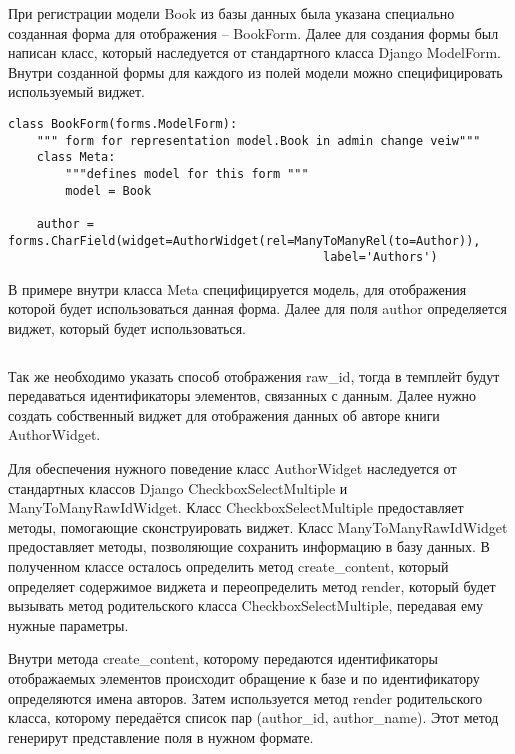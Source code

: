 \documentclass[a4paper, 12pt]{report}
\begin{document}
При регистрации модели Book из базы данных была указана специально созданная форма для отображения -- BookForm. Далее для создания формы был написан класс, который наследуется от стандартного класса Django ModelForm. Внутри созданной формы для каждого из полей модели можно специфицировать используемый виджет.

\begin{verbatim}
class BookForm(forms.ModelForm):
    """ form for representation model.Book in admin change veiw"""
    class Meta:
        """defines model for this form """
        model = Book

    author = forms.CharField(widget=AuthorWidget(rel=ManyToManyRel(to=Author)), 
                                            label='Authors')
\end{verbatim}

В примере внутри класса Meta специфицируется модель, для отображения которой будет использоваться данная форма. Далее для поля author определяется виджет, который будет использоваться. 

\begin{verbatim}

\end{verbatim}
Так же необходимо указать способ отображения raw\_id, тогда в темплейт будут передаваться идентификаторы элементов, связанных с данным. Далее нужно создать собственный виджет для отображения данных об авторе книги AuthorWidget. 

Для обеспечения нужного поведение класс AuthorWidget наследуется от стандартных классов Django CheckboxSelectMultiple и ManyToManyRawIdWidget. Класс CheckboxSelectMultiple предоставляет методы, помогающие сконструировать виджет. Класс ManyToManyRawIdWidget предоставляет методы, позволяющие сохранить информацию в базу данных. В полученном классе осталось определить метод create\_content, который определяет содержимое виджета и переопределить метод render, который будет вызывать метод родительского класса CheckboxSelectMultiple, передавая ему нужные параметры. 

Внутри метода create\_content, которому передаются идентификаторы отображаемых элементов происходит обращение к базе и по идентификатору определяются имена авторов. Затем используется метод render родительского класса, которому передаётся список пар (author\_id, author\_name). Этот метод генерирут представление поля в нужном формате.
\end{document}
